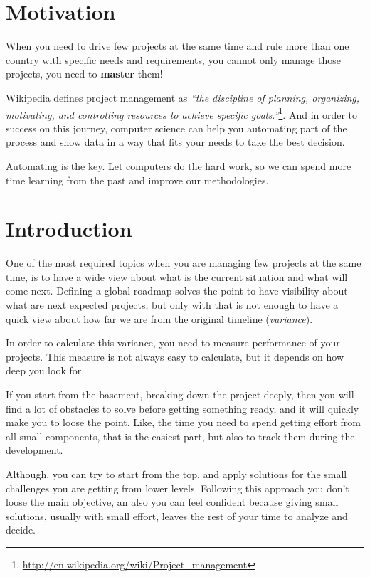 \documentclass[a4paper,12pt]{article}
\begin{document}
\begin{multicols}{2}

\section{Motivation}
When you need to drive few projects at the same time and rule more than one
country with specific needs and requirements, you cannot only manage those
projects, you need to \textbf{master} them!

Wikipedia defines project management as \emph{``the discipline of
planning, organizing, motivating, and controlling resources to achieve specific
goals.''}\footnote{\url{http://en.wikipedia.org/wiki/Project\_management}}.
And in order to success on this journey, computer science can help you
automating part of the process and show data in a way that fits your needs to
take the best decision.

Automating is the key. Let computers do the hard work, so we can 
spend more time learning from the past and improve our methodologies.


\section{Introduction}
One of the most required topics when you are managing few projects at the same 
time, is to have a wide view about what is the current situation and what will
come next.
Defining a global roadmap solves the point to have visibility about what are next 
expected projects, but only with that is not enough to have a quick view
about how far we are from the original timeline (\emph{variance}).

In order to calculate this variance, you need to measure performance of your
projects. This measure is not always easy to calculate, but it depends on how
deep you look for.

If you start from the basement, breaking down the project deeply, then you
will find a lot of obstacles to solve before getting something ready, and it
will quickly make you to loose the point. Like, the time you need to spend getting effort
from all small components, that is the easiest part, but also to track them
during the development.

Although, you can try to start from the top, and apply solutions for the small
challenges you are getting from lower levels. Following this approach you don't 
loose the main objective, an also you can feel confident because giving small
solutions, usually with small effort, leaves the rest of your time to analyze
and decide.


\end{multicols}
\end{document}

